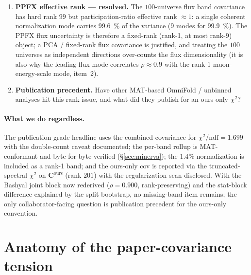 \documentclass[12pt]{article}
\newcommand{\Eavail}{E_{\mathrm{avail}}}
\begin{document}
\begin{enumerate}[nosep,leftmargin=2em]
        \texttt{MAT-MINERvA/universes/GenieSystematics.cxx:37-38} with
        the note that ``this knob should not currently be evaluated.''
        We are consistent with MAT in excluding it, and an independent
        \texttt{grwght1p} pass confirms both it ($\le\SI{0.74}{\percent}$ on
        $d\sigma/d\Eavail$) and \texttt{FrAbs\_pi} ($\le\SI{0.82}{\percent}$) are
        sub-percent --- a $<\SI{1}{\percent}$ knob cannot affect the budget. The
        only residual is a one-line confirmation that the exclusion is still
        current guidance (immaterial to the result).
  \item \textbf{PPFX effective rank --- resolved.} The $100$-universe flux band
        covariance has hard rank $99$ but participation-ratio effective rank
        $\approx1$: a single coherent normalization mode carries
        \SI{99.6}{\percent} of the variance ($9$ modes for \SI{99.9}{\percent}).
        The PPFX flux uncertainty is therefore a fixed-rank (rank-1, at most
        rank-9) object; a PCA / fixed-rank flux covariance is justified, and
        treating the $100$ universes as independent directions over-counts the
        flux dimensionality (it is also why the leading flux mode correlates
        $\rho\approx0.9$ with the rank-1 muon-energy-scale mode, item~2).
  \item \textbf{Publication precedent.} Have other MAT-based OmniFold /
        unbinned analyses hit this rank issue, and what did they publish
        for an ours-only $\chi^{2}$?
\end{enumerate}

\paragraph{What we do regardless.}
The publication-grade headline uses the combined covariance for
$\chi^{2}/\mathrm{ndf}=1.699$ with the double-count caveat documented;
the per-band rollup is MAT-conformant and byte-for-byte verified
(\S\ref{sec:minerva}); the $1.4\%$ normalization is included as a
rank-1 band; and the ours-only cov is reported via the truncated-spectral
$\chi^{2}$ on $\mathbf{C}^{\mathrm{ours}}$ (rank $201$) with the
regularization scan disclosed. With the Bashyal joint block now rederived
($\rho=0.900$, rank-preserving) and the stat-block difference explained by the
split bootstrap, no missing-band item remains; the only collaborator-facing
question is publication precedent for the ours-only convention.

\section{Anatomy of the paper-covariance tension}
\label{sec:tension}
\end{document}
